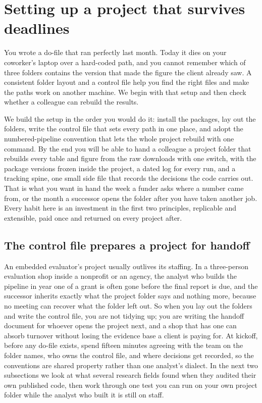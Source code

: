\chapter{Setting up a project that survives deadlines}\label{ch:workshop}

You wrote a do-file that ran perfectly last month. Today it dies on your coworker's laptop over a hard-coded path, and you cannot remember which of three folders contains the version that made the figure the client already saw. A consistent folder layout and a control file help you find the right files and make the paths work on another machine. We begin with that setup and then check whether a colleague can rebuild the results.

We build the setup in the order you would do it: install the packages, lay out the folders, write the control file that sets every path in one place, and adopt the numbered-pipeline convention that lets the whole project rebuild with one command. By the end you will be able to hand a colleague a project folder that rebuilds every table and figure from the raw downloads with one switch, with the package versions frozen inside the project, a dated log for every run, and a tracking spine, one small side file that records the decisions the code carries out. That is what you want in hand the week a funder asks where a number came from, or the month a successor opens the folder after you have taken another job. Every habit here is an investment in the first two principles, replicable and extensible, paid once and returned on every project after.

\section{The control file prepares a project for handoff}\label{sec:ch02-teamscience}
An embedded evaluator's project usually outlives its staffing. In a three-person evaluation shop inside a nonprofit or an agency, the analyst who builds the pipeline in year one of a grant is often gone before the final report is due, and the successor inherits exactly what the project folder says and nothing more, because no meeting can recover what the folder left out. So when you lay out the folders and write the control file, you are not tidying up; you are writing the handoff document for whoever opens the project next, and a shop that has one can absorb turnover without losing the evidence base a client is paying for. At kickoff, before any do-file exists, spend fifteen minutes agreeing with the team on the folder names, who owns the control file, and where decisions get recorded, so the conventions are shared property rather than one analyst's dialect. In the next two subsections we look at what several research fields found when they audited their own published code, then work through one test you can run on your own project folder while the analyst who built it is still on staff.

